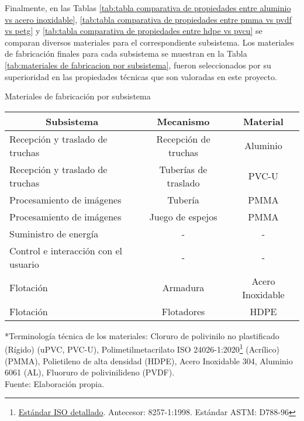 Finalmente, en las Tablas \ref{tab:tabla comparativa de propiedades entre aluminio vs acero inoxidable}, \ref{tab:tabla comparativa de propiedades entre pmma vs pvdf vs petg} y \ref{tab:tabla comparativa de propiedades entre hdpe vs pvcu} se comparan diversos materiales para el correspondiente subsistema. Los materiales de fabricación finales para cada subsistema se muestran en la Tabla \ref{tab:materiales de fabricacion por subsistema}, fueron seleccionados por su superioridad en las propiedades técnicas que son valoradas en este proyecto. 

\begin{savenotes}
	\begin{mytable}[H]
		\centering
		\caption{Materiales de fabricación por subsistema}
		\label{tab:materiales de fabricacion por subsistema}
		\begin{tabular}{|l|c|c|}
			\hline
			\multicolumn{1}{|c|}{\textbf{Subsistema}} & \multicolumn{1}{c|}{\textbf{Mecanismo}} & \textbf{Material} \\ \hline
			Recepción y traslado de truchas      & Recepción de truchas   & Aluminio  \\ \hline
			Recepción y traslado de truchas      & Tuberías de traslado   & PVC-U    \\ \hline
			Procesamiento de imágenes            & Tubería                & PMMA  \\ \hline
			Procesamiento de imágenes            & Juego de espejos       & PMMA  \\ \hline
			Suministro de energía                & \multicolumn{1}{c|}{-} & -    \\ \hline
			Control e interacción con el usuario & \multicolumn{1}{c|}{-} & -  \\ \hline
			Flotación                            & Armadura               & Acero Inoxidable \\ \hline
			Flotación                            & Flotadores             & HDPE  \\ \hline
		\end{tabular}
		\begin{flushleft}
		*Terminología técnica de los materiales: Cloruro de polivinilo no plastificado (Rígido) (uPVC, PVC-U), Polimetilmetacrilato ISO 24026-1:2020\footnote{\href{https://www.iso.org/standard/77547.html}{Estándar ISO detallado}. Antecesor: 8257-1:1998. Estándar ASTM: D788-96} (Acrílico) (PMMA), Polietileno de alta densidad (HDPE), Acero Inoxidable 304, Aluminio 6061 (AL), Fluoruro de polivinilideno (PVDF).\\	
		Fuente: Elaboración propia.
		\end{flushleft}
	\end{mytable}
\end{savenotes}

